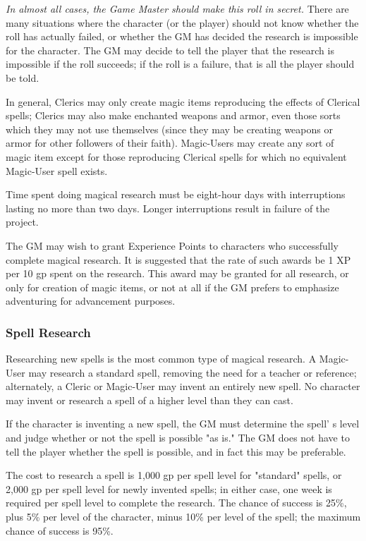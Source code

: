 \documentclass[a4paper,twoside,openany,10pt]{book}
\begin{document}
\begin{multicols}{2}
\emph{In almost all cases, the Game Master should make this roll in secret.} There are many situations where the character (or the player) should not know whether the roll has actually failed, or whether the GM has decided the research is impossible for the character. The GM may decide to tell the player that the research is impossible if the roll succeeds; if the roll is a failure, that is all the player should be told.

In general, Clerics may only create magic items reproducing the effects of Clerical spells; Clerics may also make enchanted weapons and armor, even those sorts which they may not use themselves (since they may be creating weapons or armor for other followers of their faith). Magic-Users may create any sort of magic item except for those reproducing Clerical spells for which no equivalent Magic-User spell exists.

Time spent doing magical research must be eight-hour days with interruptions lasting no more than two days. Longer interruptions result in failure of the project.

The GM may wish to grant Experience Points to characters who successfully complete magical research. It is suggested that the rate of such awards be 1 XP per 10 gp spent on the research. This award may be granted for all research, or only for creation of magic items, or not at all if the GM prefers to emphasize adventuring for advancement purposes.

\subsubsection{Spell Research}\label{spell-research}

Researching new spells is the most common type of magical research. A Magic-User may research a standard spell, removing the need for a teacher or reference; alternately, a Cleric or Magic-User may invent an entirely new spell. No character may invent or research a spell of a higher level than they can cast.

If the character is inventing a new spell, the GM must determine the spell' s level and judge whether or not the spell is possible "as is." The GM does not have to tell the player whether the spell is possible, and in fact this may be preferable.

The cost to research a spell is 1,000 gp per spell level for "standard" spells, or 2,000 gp per spell level for newly invented spells; in either case, one week is required per spell level to complete the research. The chance of success is 25\%, plus 5\% per level of the character, minus 10\% per level of the spell; the maximum chance of success is 95\%.


\end{multicols}
\end{document}
